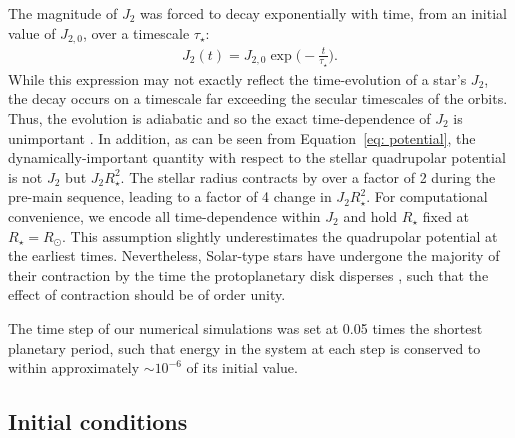 \documentclass[twocolumn]{aastex63}
\begin{document}
The magnitude of $J_2$ was forced to decay exponentially with time, from an initial value of $J_{2,0}$, over a timescale $\tau_\star$:
\begin{align}
J_{2}(t)=J_{2,0}\exp{\bigg(-\frac{t}{\tau_\star}\bigg)}.
\end{align}
While this expression may not exactly reflect the time-evolution of a star's $J_2$, the decay occurs on a timescale far exceeding the secular timescales of the orbits. Thus, the evolution is adiabatic and so the exact time-dependence of $J_2$ is unimportant \citep{henrard1982adiabatic,morbidelli2002modern}. In addition, as can be seen from Equation~\ref{eq: potential}, the dynamically-important quantity with respect to the stellar quadrupolar potential is not $J_2$ but $J_2 R_\star^2$. The stellar radius contracts by over a factor of 2 during the pre-main sequence, leading to a factor of 4 change in $J_2 R_\star^2$. For computational convenience, we encode all time-dependence within $J_2$ and hold $R_\star$ fixed at $R_\star=R_\odot$. This assumption slightly underestimates the quadrupolar potential at the earliest times. Nevertheless, Solar-type stars have undergone the majority of their contraction by the time the protoplanetary disk disperses \citep{gregory2016influence}, such that the effect of contraction should be of order unity. 


The time step of our numerical simulations was set at 0.05 times the shortest planetary period, such that energy in the system at each step is conserved to within approximately $\sim10^{-6}$ of its initial value. 

\subsection{Initial conditions}
\end{document}
